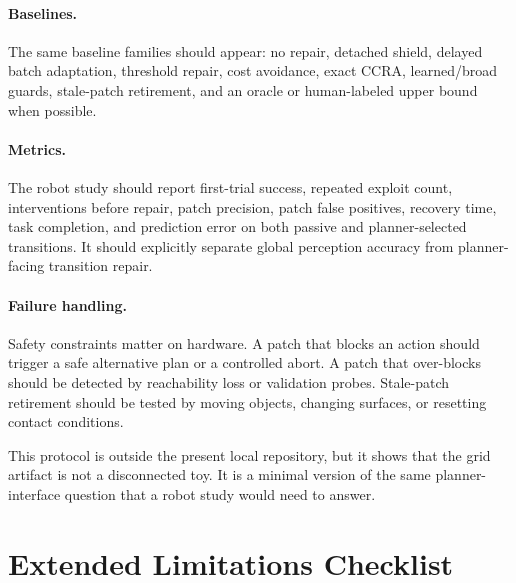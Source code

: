 \documentclass{article}
\begin{document}
\paragraph{Baselines.}
The same baseline families should appear: no repair, detached shield, delayed batch adaptation, threshold repair, cost avoidance, exact CCRA, learned/broad guards, stale-patch retirement, and an oracle or human-labeled upper bound when possible.

\paragraph{Metrics.}
The robot study should report first-trial success, repeated exploit count, interventions before repair, patch precision, patch false positives, recovery time, task completion, and prediction error on both passive and planner-selected transitions. It should explicitly separate global perception accuracy from planner-facing transition repair.

\paragraph{Failure handling.}
Safety constraints matter on hardware. A patch that blocks an action should trigger a safe alternative plan or a controlled abort. A patch that over-blocks should be detected by reachability loss or validation probes. Stale-patch retirement should be tested by moving objects, changing surfaces, or resetting contact conditions.

This protocol is outside the present local repository, but it shows that the grid artifact is not a disconnected toy. It is a minimal version of the same planner-interface question that a robot study would need to answer.

\section{Extended Limitations Checklist}
\end{document}
